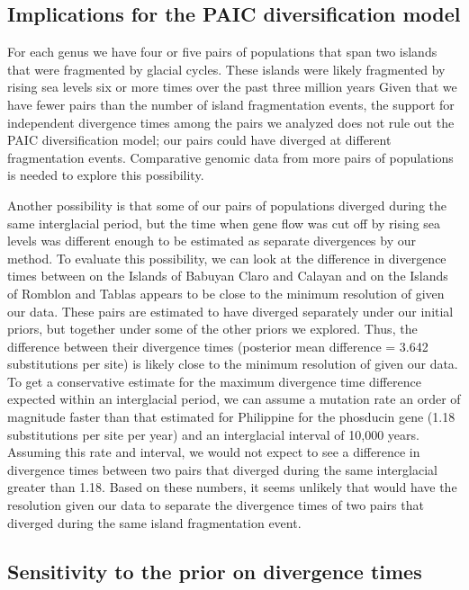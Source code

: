 \subsection{Implications for the PAIC diversification model}

For each genus we have four or five pairs of populations that span two islands
that were fragmented by glacial cycles.
These islands were likely fragmented by rising sea levels six or more times
over the past three million years
Given that we have fewer pairs than the number of island fragmentation events,
the support for independent divergence times among the pairs we analyzed does
not rule out the PAIC diversification model; our pairs could have diverged
at different fragmentation events.
Comparative genomic data from more pairs of populations is needed to explore
this possibility.

Another possibility is that some of our pairs of populations diverged during
the same interglacial period, but the time when gene flow was cut off by rising
sea levels was different enough to be estimated as separate divergences by our
method.
To evaluate this possibility, we can look at the  difference in divergence
times between  on the Islands of Babuyan Claro and Calayan
and  on the Islands of Romblon and Tablas appears to be close
to the minimum resolution of \ecoevolity given our data.
These pairs are estimated to have diverged separately under our initial priors,
but together under some of the other priors we explored.
Thus, the difference between their divergence times (posterior mean difference
= 3.642 substitutions per site) is likely close to the minimum resolution
of \ecovolity given our data.
To get a conservative estimate for the maximum divergence time difference
expected within an interglacial period, we can assume a mutation rate an order
of magnitude faster than that estimated for Philippine  for the
phosducin gene (1.18 substitutions per site per year) and an interglacial
interval of 10,000 years.
Assuming this rate and interval, we would not expect to see a difference in
divergence times between two pairs that diverged during the same interglacial
greater than 1.18.
Based on these numbers, it seems unlikely that \ecoevolity would have the
resolution given our data to separate the divergence times of two pairs that
diverged during the same island fragmentation event.


\subsection{Sensitivity to the prior on divergence times}

